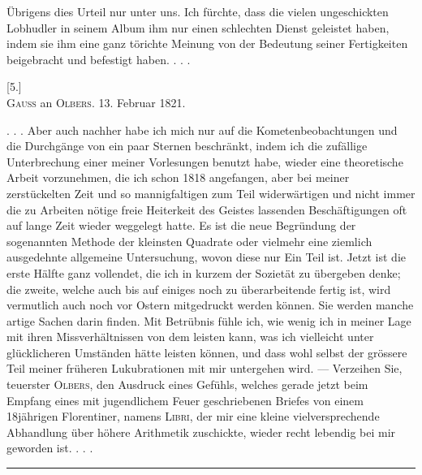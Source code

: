 Übrigens dies Urteil nur unter uns. Ich fürchte, dass die vielen ungeschickten
Lobhudler in seinem Album ihm nur einen schlechten Dienst geleistet
haben, indem sie ihm eine ganz törichte Meinung von der Bedeutung
seiner Fertigkeiten beigebracht und befestigt haben. . . .
\begin{center}[5.]\\[3pt]
\textsc{Gauss} an \textsc{Olbers}. 13. Februar 1821.\end{center}
\noindent\hspace*{\parindent}. . . Aber auch nachher habe ich mich nur auf die Kometenbeobachtungen
und die Durchgänge von ein paar Sternen beschränkt, indem ich die
zufällige Unterbrechung einer meiner Vorlesungen benutzt habe, wieder eine
theoretische Arbeit vorzunehmen, die ich schon 1818 angefangen, aber bei
meiner zerstückelten Zeit und so mannigfaltigen zum Teil widerwärtigen und
nicht immer die zu  Arbeiten nötige freie Heiterkeit des Geistes
lassenden Beschäftigungen oft auf lange Zeit wieder weggelegt hatte. Es ist
die neue Begründung der sogenannten Methode der kleinsten Quadrate oder
vielmehr eine ziemlich ausgedehnte allgemeine Untersuchung, wovon diese
\clearpage{}
\noindent nur Ein Teil ist. Jetzt ist die erste Hälfte ganz vollendet, die ich in kurzem
der Sozietät zu übergeben denke; die zweite, welche auch bis auf einiges
noch zu überarbeitende fertig ist, wird vermutlich auch noch vor Ostern mitgedruckt
werden können. Sie werden manche artige Sachen darin finden.
Mit Betrübnis fühle ich, wie wenig ich in meiner Lage mit  ihren Missverhältnissen
von dem leisten kann, was ich vielleicht unter glücklicheren Umständen
hätte leisten können, und dass wohl selbst der grössere Teil meiner
früheren Lukubrationen mit mir untergehen wird. — Verzeihen Sie, teuerster
\textsc{Olbers}, den Ausdruck eines Gefühls, welches gerade jetzt beim Empfang
eines mit jugendlichem Feuer geschriebenen Briefes von einem 18jährigen
Florentiner, namens \textsc{Libri}, der mir eine kleine vielversprechende Abhandlung
über höhere Arithmetik zuschickte, wieder recht lebendig bei mir geworden
ist. . . .
\begin{center}\rule{.24\linewidth}{.35pt}\end{center}
\clearpage\endgroup

